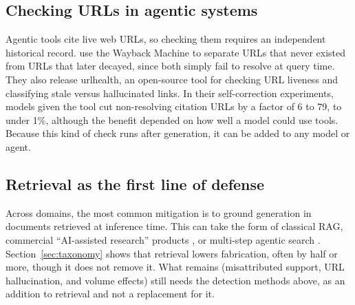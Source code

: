 \documentclass[acmsmall,screen]{acmart}
\begin{document}
\subsection{Checking URLs in agentic systems}
Agentic tools cite live web URLs, so checking them requires an independent historical record. \citet{rao2026} use the Wayback Machine to separate URLs that never existed from URLs that later decayed, since both simply fail to resolve at query time. They also release urlhealth, an open-source tool for checking URL liveness and classifying stale versus hallucinated links. In their self-correction experiments, models given the tool cut non-resolving citation URLs by a factor of 6 to 79, to under 1\%, although the benefit depended on how well a model could use tools. Because this kind of check runs after generation, it can be added to any model or agent.

\subsection{Retrieval as the first line of defense}
Across domains, the most common mitigation is to ground generation in documents retrieved at inference time. This can take the form of classical RAG, commercial ``AI-assisted research'' products \citep{magesh2025}, or multi-step agentic search \citep{du2025,rao2026}. Section~\ref{sec:taxonomy} shows that retrieval lowers fabrication, often by half or more, though it does not remove it. What remains (misattributed support, URL hallucination, and volume effects) still needs the detection methods above, as an addition to retrieval and not a replacement for it.
\end{document}
